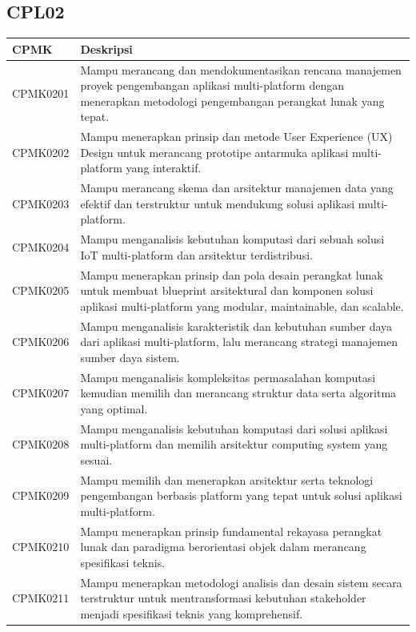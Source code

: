 \subsection{CPL02}
\begin{longtable}{L{2cm}L{12cm}}
\toprule
CPMK & Deskripsi \\
\midrule
\endhead
CPMK0201 & Mampu merancang dan mendokumentasikan rencana manajemen proyek pengembangan aplikasi multi-platform dengan menerapkan metodologi pengembangan perangkat lunak yang tepat. \\
CPMK0202 & Mampu menerapkan prinsip dan metode User Experience (UX) Design untuk merancang prototipe antarmuka aplikasi multi-platform yang interaktif. \\
CPMK0203 & Mampu merancang skema dan arsitektur manajemen data yang efektif dan terstruktur untuk mendukung solusi aplikasi multi-platform. \\
CPMK0204 & Mampu menganalisis kebutuhan komputasi dari sebuah solusi IoT multi-platform dan arsitektur terdistribusi. \\
CPMK0205 & Mampu menerapkan prinsip dan pola desain perangkat lunak untuk membuat blueprint arsitektural dan komponen solusi aplikasi multi-platform yang modular, maintainable, dan scalable. \\
CPMK0206 & Mampu menganalisis karakteristik dan kebutuhan sumber daya dari aplikasi multi-platform, lalu merancang strategi manajemen sumber daya sistem. \\
CPMK0207 & Mampu menganalisis kompleksitas permasalahan komputasi kemudian memilih dan merancang struktur data serta algoritma yang optimal. \\
CPMK0208 & Mampu menganalisis kebutuhan komputasi dari solusi aplikasi multi-platform dan memilih arsitektur computing system yang sesuai. \\
CPMK0209 & Mampu memilih dan menerapkan arsitektur serta teknologi pengembangan berbasis platform yang tepat untuk solusi aplikasi multi-platform. \\
CPMK0210 & Mampu menerapkan prinsip fundamental rekayasa perangkat lunak dan paradigma berorientasi objek dalam merancang spesifikasi teknis. \\
CPMK0211 & Mampu menerapkan metodologi analisis dan desain sistem secara terstruktur untuk mentransformasi kebutuhan stakeholder menjadi spesifikasi teknis yang komprehensif. \\
\bottomrule
\end{longtable}

